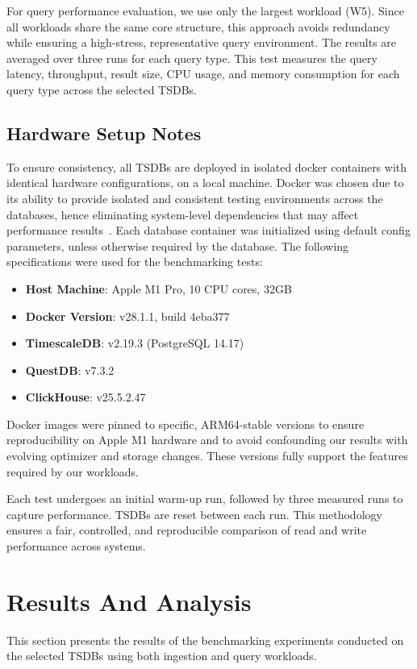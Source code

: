 \documentclass[conference]{IEEEtran}
\begin{document}
For query performance evaluation, we use only the largest workload (W5). Since all workloads share the same core structure, this approach avoids redundancy while ensuring a high-stress, representative query environment. The results are averaged over three runs for each query type. This test measures the query latency, throughput, result size, CPU usage, and memory consumption for each query type across the selected TSDBs.

\subsection{Hardware Setup Notes}
To ensure consistency, all TSDBs are deployed in isolated docker containers with identical hardware configurations, on a local machine. Docker was chosen due to its ability to provide isolated and consistent testing environments across the databases, hence eliminating system-level dependencies that may affect performance results~\cite{16_felter2015docker}. 
Each database container was initialized using default config parameters, unless otherwise required by the database. The following specifications were used for the benchmarking tests:
\begin{itemize}
  \item \textbf{Host Machine}: Apple M1 Pro, 10 CPU cores, 32GB
  \item \textbf{Docker Version}: v28.1.1, build 4eba377
  \item \textbf{TimescaleDB}: v2.19.3 (PostgreSQL 14.17)
  \item \textbf{QuestDB}: v7.3.2
  \item \textbf{ClickHouse}: v25.5.2.47
\end{itemize}

Docker images were pinned to specific, ARM64-stable versions to ensure reproducibility on Apple M1 hardware and to avoid confounding our results with evolving optimizer and storage changes. These versions fully support the features required by our workloads.

Each test undergoes an initial warm-up run, followed by three measured runs to capture performance. TSDBs are reset between each run. This methodology ensures a fair, controlled, and reproducible comparison of read and write performance across systems.

\section{Results And Analysis}\label{sec:results}
This section presents the results of the benchmarking experiments conducted on the selected TSDBs using both ingestion and query workloads.
\end{document}
